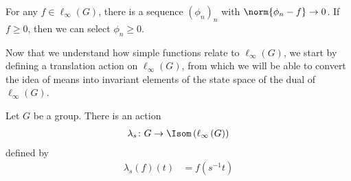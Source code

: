 \begin{corollary}
  For any $f\in \ell_{\infty}\left(G\right)$, there is a sequence $\left(\phi_n\right)_n$ with $\norm{\phi_n -f}\rightarrow 0$. If $f\geq 0$, then we can select $\phi_n\geq 0$.
\end{corollary}
Now that we understand how simple functions relate to $\ell_{\infty}(G)$, we start by defining a translation action on $\ell_{\infty}(G)$, from which we will be able to convert the idea of means into invariant elements of the state space of the dual of $\ell_{\infty}\left(G\right)$.
\begin{proposition}
  Let $G$ be a group. There is an action
  \begin{align*}
    \lambda_s\colon G\rightarrow \Isom\left(\ell_{\infty}\left(G\right)\right)
  \end{align*}
  defined by
  \begin{align*}
    \lambda_{s}\left(f\right)\left(t\right) &= f\left(s^{-1}t\right)
  \end{align*}\label{prop:translation_action}
\end{proposition}
